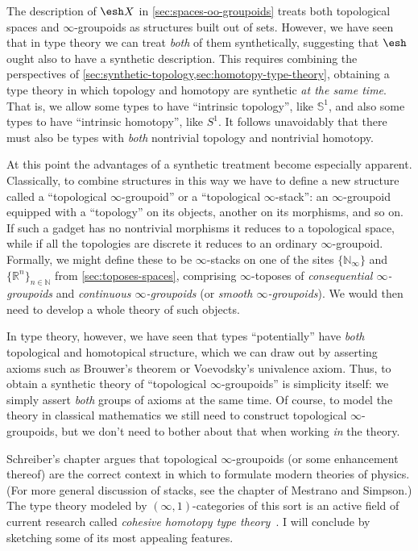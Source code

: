 \documentclass[12pt]{article}
\def\oo{\ensuremath{\infty}}
\def\io{\ensuremath{(\oo,1)}}
\def\N{\mathbb{N}}
\def\R{\mathbb{R}}
\def\hocirc{S^1}
\def\topcirc{\mathbb{S}^1}
\numberwithin{equation}{section}
\newcommand{\shape}{\ensuremath{\mathord{\raisebox{0.5pt}{\text{\rm\esh}}}}}
\begin{document}
The description of $\shape X$ in \cref{sec:spaces-oo-groupoids} treats both topological spaces and \oo-groupoids as structures built out of sets.
However, we have seen that in type theory we can treat \emph{both} of them synthetically, suggesting that $\shape$ ought also to have a synthetic description.
This requires combining the perspectives of \cref{sec:synthetic-topology,sec:homotopy-type-theory}, obtaining a type theory in which topology and homotopy are synthetic \emph{at the same time}.
That is, we allow some types to have ``intrinsic topology'', like $\topcirc$, and also some types to have ``intrinsic homotopy'', like $\hocirc$.
It follows unavoidably that there must also be types with \emph{both} nontrivial topology and nontrivial homotopy.

At this point the advantages of a synthetic treatment become especially apparent.
Classically, to combine structures in this way we have to define a new structure called a ``topological \oo-groupoid'' or a ``topological \oo-stack'': an \oo-groupoid equipped with a ``topology'' on its objects, another on its morphisms, and so on.
If such a gadget has no nontrivial morphisms it reduces to a topological space, while if all the topologies are discrete it reduces to an ordinary \oo-groupoid.
Formally, we might define these to be \oo-stacks on one of the sites $\{\N_\oo\}$ and $\{\R^n\}_{n\in \N}$ from \cref{sec:toposes-spaces}, comprising \oo-toposes of \emph{consequential \oo-groupoids} and \emph{continuous \oo-groupoids} (or \emph{smooth \oo-groupoids}).
We would then need to develop a whole theory of such objects.

In type theory, however, we have seen that types ``potentially'' have \emph{both} topological and homotopical structure, which we can draw out by asserting axioms such as Brouwer's theorem or Voevodsky's univalence axiom.
Thus, to obtain a synthetic theory of ``topological \oo-groupoids'' is simplicity itself: we simply assert \emph{both} groups of axioms at the same time.
Of course, to model the theory in classical mathematics we still need to construct topological \oo-groupoids, but we don't need to bother about that when working \emph{in} the theory.

Schreiber's chapter argues that topological \oo-groupoids (or some enhancement thereof) are the correct context in which to formulate modern theories of physics.
(For more general discussion of stacks, see the chapter of Mestrano and Simpson.)
The type theory modeled by \io-categories of this sort is an active field of current research called \emph{cohesive homotopy type theory}~\cite{lawvere:cohesion,schreiber:dcct,ss:qgftchtt,shulman:bfp-realcohesion}.
I will conclude by sketching some of its most appealing features.
\end{document}
